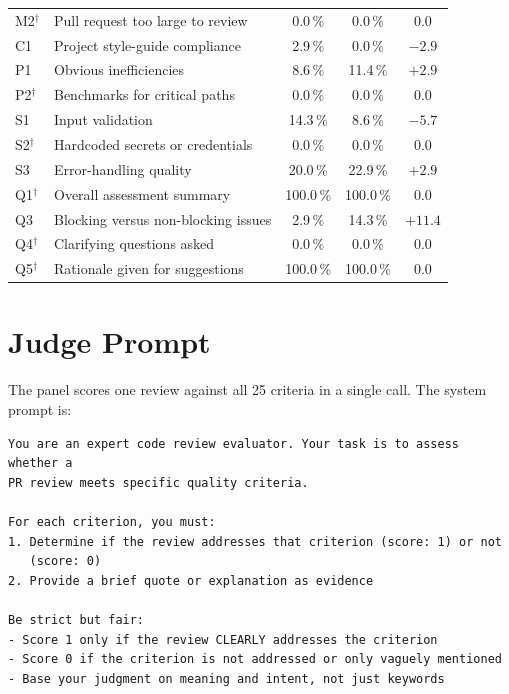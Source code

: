\begin{table}[htbp]
\begin{tabular}{llccc}
        M2$^{\dagger}$ & Pull request too large to review & 0.0\,\% & 0.0\,\% & $0.0$ \\
        C1 & Project style-guide compliance       & 2.9\,\%   & 0.0\,\%   & $-2.9$ \\
        P1 & Obvious inefficiencies               & 8.6\,\%   & 11.4\,\%  & $+2.9$ \\
        P2$^{\dagger}$ & Benchmarks for critical paths  & 0.0\,\%  & 0.0\,\%  & $0.0$ \\
        S1 & Input validation                     & 14.3\,\%  & 8.6\,\%   & $-5.7$ \\
        S2$^{\dagger}$ & Hardcoded secrets or credentials & 0.0\,\% & 0.0\,\% & $0.0$ \\
        S3 & Error-handling quality               & 20.0\,\%  & 22.9\,\%  & $+2.9$ \\
        Q1$^{\dagger}$ & Overall assessment summary       & 100.0\,\% & 100.0\,\% & $0.0$ \\
        Q3 & Blocking versus non-blocking issues  & 2.9\,\%   & 14.3\,\%  & $+11.4$ \\
        Q4$^{\dagger}$ & Clarifying questions asked       & 0.0\,\% & 0.0\,\% & $0.0$ \\
        Q5$^{\dagger}$ & Rationale given for suggestions  & 100.0\,\% & 100.0\,\% & $0.0$ \\
        \bottomrule
    \end{tabular}
\end{table}

\section{Judge Prompt}
\label{app:prompts-judge}

The panel scores one review against all 25 criteria in a single call. The system
prompt is:

{\footnotesize
\begin{verbatim}
You are an expert code review evaluator. Your task is to assess whether a
PR review meets specific quality criteria.

For each criterion, you must:
1. Determine if the review addresses that criterion (score: 1) or not
   (score: 0)
2. Provide a brief quote or explanation as evidence

Be strict but fair:
- Score 1 only if the review CLEARLY addresses the criterion
- Score 0 if the criterion is not addressed or only vaguely mentioned
- Base your judgment on meaning and intent, not just keywords
\end{verbatim}
}

